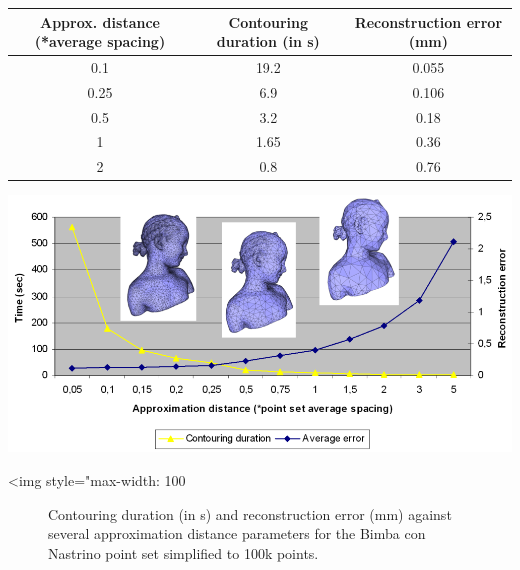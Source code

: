 \begin{tabular}{|c|c|c|}
  \hline
  Approx. distance (*average spacing)    & Contouring duration (in s) & Reconstruction error (mm) \\
  \hline
  0.1                                    & 19.2                       & 0.055 \\
  0.25                                   & 6.9                        & 0.106 \\
  0.5                                    & 3.2                        & 0.18 \\
  1                                      & 1.65                        & 0.36 \\
  2                                      & 0.8                         & 0.76 \\
  \hline
\end{tabular}

\begin{center}
    \begin{ccTexOnly}
      \includegraphics[width=1.0\textwidth]{Surface_reconstruction_points_3/contouring_bench}
    \end{ccTexOnly}
    \begin{ccHtmlOnly}
        <img style="max-width: 100%
    \end{ccHtmlOnly}
    \begin{figure}[h]
        \caption{Contouring duration (in s) and reconstruction error (mm)
                 against several approximation distance parameters
                 for the Bimba con Nastrino point set simplified to 100k points.}
        \label{Surface_reconstruction_points_3-fig-contouring_bench}
    \end{figure}
\end{center}



